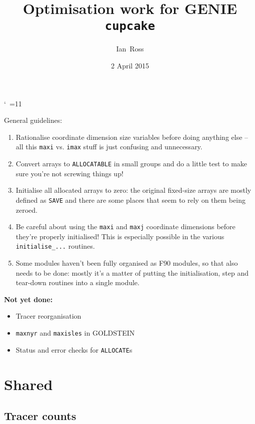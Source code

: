 \documentclass[a4paper,10pt,article]{memoir}
\title{Optimisation work for GENIE \texttt{cupcake}}
\author{Ian~Ross}
\date{2 April 2015}
\begin{document}
\catcode`~=11    %

\maketitle

General guidelines:
\begin{enumerate}
  \item{Rationalise coordinate dimension size variables before doing
    anything else -- all this \texttt{maxi} vs. \texttt{imax} stuff is
    just confusing and unnecessary.}
  \item{Convert arrays to \texttt{ALLOCATABLE} in small groups and do
    a little test to make sure you're not screwing things up!}
  \item{Initialise all allocated arrays to zero: the original
    fixed-size arrays are mostly defined as \texttt{SAVE} and there
    are some places that seem to rely on them being zeroed.}
  \item{Be careful about using the \texttt{maxi} and \texttt{maxj}
    coordinate dimensions before they're properly initialised!  This
    is especially possible in the various \texttt{initialise\_...}
    routines.}
  \item{Some modules haven't been fully organised as F90 modules, so
    that also needs to be done: mostly it's a matter of putting the
    initialisation, step and tear-down routines into a single module.}
\end{enumerate}

\textbf{Not yet done:}
\begin{itemize}
  \item{Tracer reorganisation}
  \item{\texttt{maxnyr} and \texttt{maxisles} in GOLDSTEIN}
  \item{Status and error checks for \texttt{ALLOCATE}s}
\end{itemize}

\chapter{Shared}

\section{Tracer counts}
\end{document}
